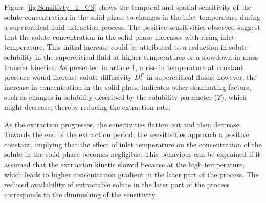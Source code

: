 \documentclass[../Article_Sensitivity_Analsysis.tex]{subfiles}
\begin{document}
	Figure \ref{fig:Sensitivty_T_CS} shows the temporal and spatial sensitivity of the solute concentration in the solid phase to changes in the inlet temperature during a supercritical fluid extraction process. The positive sensitivities observed suggest that the solute concentration in the solid phase increases with rising inlet temperature. This initial increase could be attributed to a reduction in solute solubility in the supercritical fluid at higher temperatures or a slowdown in mass transfer kinetics. As presented in {\color{red}article 1}, a rise in temperature at constant pressure would increase solute diffusivity $D_i^R$ in supercritical fluids; however, the increase in concentration in the solid phase indicates other dominating factors, such as changes in solubility described by the solubility parameter ($\Upsilon$), which might decrease, thereby reducing the extraction rate.
	
	As the extraction progresses, the sensitivities flatten out and then decrease. Towards the end of the extraction period, the sensitivities approach a positive constant, implying that the effect of inlet temperature on the concentration of the solute in the solid phase becomes negligible. This behaviour can be explained if it assumed that the extraction kinetic slowed because at the high temperature, which leads to higher concentration gradient in the later part of the process. The reduced availability of extractable solute in the later part of the process corresponds to the diminishing of the sensitivity.
	
	
	
\end{document}
